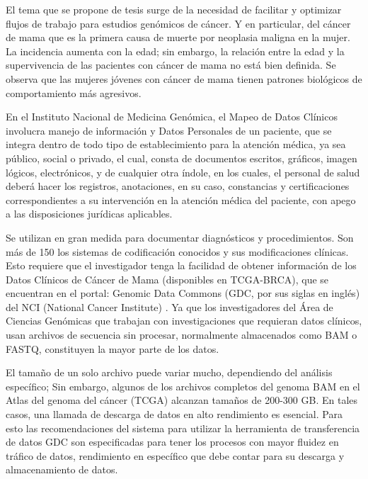 \documentclass[10pt,a4paper]{article}
\begin{document}
El tema que se propone de tesis surge de la necesidad de facilitar y optimizar flujos de trabajo para estudios gen\'omicos de c\'ancer. Y  en particular, del c\'ancer de mama que es la primera causa de muerte por neoplasia maligna en la mujer. La incidencia aumenta con la edad; sin embargo, la relaci\'on entre la edad y la supervivencia de las pacientes con c\'ancer de mama no est\'a bien definida. Se observa que las mujeres j\'ovenes con c\'ancer de mama tienen patrones biol\'ogicos de comportamiento m\'as agresivos. 

En el Instituto Nacional de Medicina Gen\'omica, el Mapeo de Datos Cl\'inicos involucra manejo de informaci\'on y Datos Personales de un paciente, que se integra dentro de todo tipo de establecimiento para la atenci\'on m\'edica, ya sea p\'ublico, social o privado, el cual, consta de documentos escritos, gr\'aficos, imagen l\'ogicos, electr\'onicos, y de cualquier otra \'indole, en los cuales, el personal de salud deber\'a hacer los registros, anotaciones, en su caso, constancias y certificaciones correspondientes a su intervenci\'on en la atenci\'on m\'edica del paciente, con apego a las disposiciones jur\'idicas aplicables. 

Se utilizan en gran medida para documentar diagn\'osticos y procedimientos. Son m\'as de 150 los sistemas de codificaci\'on conocidos y sus modificaciones cl\'inicas. Esto requiere que el investigador tenga la facilidad de obtener informaci\'on de los Datos Cl\'inicos de C\'ancer de Mama (disponibles en TCGA-BRCA), que se encuentran en el portal: Genomic Data Commons (GDC, por sus siglas en ingl\'es) del NCI (National Cancer Institute) \cite{cerami2012cbio}. Ya que los investigadores del \'Area de Ciencias Gen\'omicas que trabajan con investigaciones que requieran datos cl\'inicos, usan archivos de secuencia sin procesar, normalmente almacenados como BAM o FASTQ, constituyen la mayor parte de los datos. 

El tama\~no de un solo archivo puede variar mucho, dependiendo del an\'alisis espec\'ifico; Sin embargo, algunos de los archivos completos del genoma BAM en el Atlas del genoma del c\'ancer (TCGA) alcanzan tama\~nos de 200-300 GB. En tales casos, una llamada de descarga de datos en alto rendimiento es esencial. Para esto las recomendaciones del sistema para utilizar la herramienta de transferencia de datos GDC son especificadas para tener los procesos con mayor fluidez en tr\'afico de datos, rendimiento en espec\'ifico que debe contar para su descarga y almacenamiento de datos. 
\end{document}
